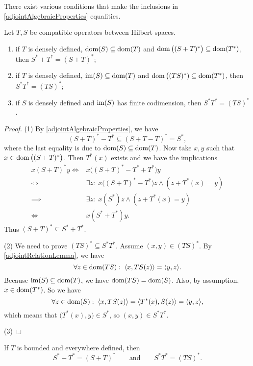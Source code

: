 There exist various conditions that make the inclusions in \ref{adjointAlgebraicProperties} equalities.
\begin{proposition} \label{equalityAlgebraicPropertiesAdjoint}
Let $T,S$ be compatible operators between Hilbert spaces.
\begin{enumerate}
\item if $T$ is densely defined, $\operatorname{dom}(S) \subseteq \operatorname{dom}(T)$ and $\operatorname{dom}\big((S+T)^*\big) \subseteq \operatorname{dom}(T^*)$, then $S^* + T^* = (S+T)^*$;
\item if $T$ is densely defined, $\operatorname{im}(S)\subseteq \operatorname{dom}(T)$ and $\operatorname{dom}\big((TS)^*)\subseteq \operatorname{dom}(T^*)$, then $S^*T^* = (TS)^*$;
\item if $S$ is densely defined and $\operatorname{im}(S)$ has finite codimension, then $S^*T^* = (TS)^*$.
\end{enumerate}
\end{proposition}
\begin{proof}
(1) By \ref{adjointAlgebraicProperties}, we have
\[ (S+T)^* - T^* \subseteq (S+T-T)^* = S^*, \]
where the last equality is due to $\operatorname{dom}(S) \subseteq \operatorname{dom}(T)$. Now take $x,y$ such that $x\in \operatorname{dom}\big((S+T)^*\big)$. Then $T^*(x)$ exists and we have the implications
\begin{align*}
x(S+T)^*y \iff& x\big((S+T)^* - T^* + T^*\big)y \\
\iff& \exists z: \; x\big((S+T)^* - T^*\big)z \land (z+T^*(x) = y) \\
\implies& \exists z: \; x(S^*)z \land (z+T^*(x) = y) \\
\iff& x(S^* + T^*)y.
\end{align*}
Thus $(S+T)^* \subseteq S^* + T^*$.

(2) We need to prove $(TS)^* \subseteq S^*T^*$. Assume $(x,y)\in (TS)^*$. By \ref{adjointRelationLemma}, we have
\[ \forall z\in \dom(TS):\; \inner{x, TS(z)} = \inner{y, z}. \]
Because $\operatorname{im}(S)\subseteq \operatorname{dom}(T)$, we have $\operatorname{dom}(TS) = \operatorname{dom}(S)$. Also, by assumption, $x\in \operatorname{dom}(T^*)$. So we have
\[ \forall z\in \dom(S):\; \inner{x, TS(z)} = \inner{T^*(x), S(z)} = \inner{y, z}, \]
which means that $\big(T^*(x), y\big)\in S^*$, so $(x,y)\in S^*T^*$.

(3)
\end{proof}
\begin{corollary}
If $T$ is bounded and everywhere defined, then
\[ S^* + T^* = (S+T)^* \qquad\text{and}\qquad S^*T^* = (TS)^*. \]
\end{corollary}


